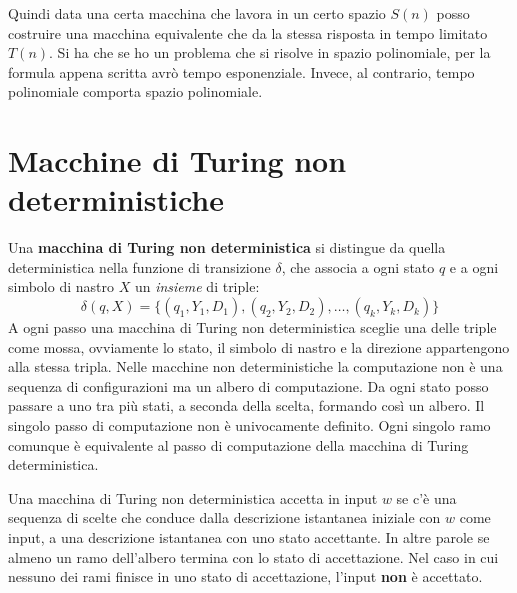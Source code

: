 Quindi data una certa macchina che lavora in un certo spazio $S(n)$ posso costruire una macchina equivalente che da la stessa risposta in tempo limitato $T(n)$. Si ha che se ho un problema che si risolve in spazio polinomiale, per la formula appena scritta avrò tempo esponenziale. Invece, al contrario, tempo polinomiale comporta spazio polinomiale.
\section{Macchine di Turing non deterministiche}
Una \textbf{macchina di Turing non deterministica} si distingue da quella deterministica nella funzione di transizione $\delta$, che associa a ogni stato $q$ e a ogni simbolo di nastro $X$ un \textit{insieme} di triple:
\begin{equation}
    \delta(q, X) = \{(q_1, Y_1, D_1), (q_2, Y_2, D_2), \dots, (q_k, Y_k, D_k)\}
\end{equation}
A ogni passo una macchina di Turing non deterministica sceglie una delle triple come mossa, ovviamente lo stato, il simbolo di nastro e la direzione appartengono alla stessa tripla. Nelle macchine non deterministiche la computazione non è una sequenza di configurazioni ma un albero di computazione. Da ogni stato posso passare a uno tra più stati, a seconda della scelta, formando così un albero. Il singolo passo di computazione non è univocamente definito. Ogni singolo ramo comunque è equivalente al passo di computazione della macchina di Turing deterministica.

Una macchina di Turing non deterministica accetta in input $w$ se c'è una sequenza di scelte che conduce dalla descrizione istantanea iniziale con $w$ come input, a una descrizione istantanea con uno stato accettante. In altre parole se almeno un ramo dell'albero termina con lo stato di accettazione. Nel caso in cui nessuno dei rami finisce in uno stato di accettazione, l'input \textbf{non} è accettato.

